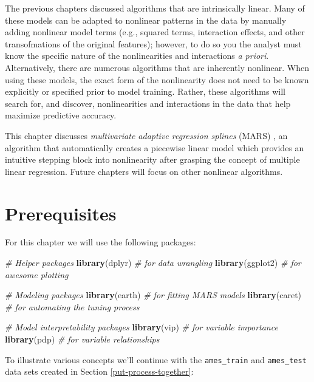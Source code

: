 \documentclass[]{krantz}
\makeatletter
\newenvironment{Shaded}{\begin{snugshade}}{\end{snugshade}}
\newcommand{\CommentTok}[1]{\textcolor[rgb]{0.37,0.37,0.37}{\textit{#1}}}
\newcommand{\KeywordTok}[1]{\textcolor[rgb]{0.27,0.27,0.27}{\textbf{#1}}}
\newcommand{\NormalTok}[1]{#1}
\newenvironment{kframe}{%
\medskip{}
\setlength{\fboxsep}{.8em}
 \def\at@end@of@kframe{}%
 \ifinner\ifhmode%
  \def\at@end@of@kframe{\end{minipage}}%
  \begin{minipage}{\columnwidth}%
 \fi\fi%
 \def\FrameCommand##1{\hskip\@totalleftmargin \hskip-\fboxsep
 \colorbox{shadecolor}{##1}\hskip-\fboxsep
     \hskip-\linewidth \hskip-\@totalleftmargin \hskip\columnwidth}%
 \MakeFramed {\advance\hsize-\width
   \@totalleftmargin\z@ \linewidth\hsize
   \@setminipage}}%
 {\par\unskip\endMakeFramed%
 \at@end@of@kframe}
\renewenvironment{Shaded}{\begin{kframe}}{\end{kframe}}
\makeatother
\begin{document}
The previous chapters discussed algorithms that are intrinsically linear. Many of these models can be adapted to nonlinear patterns in the data by manually adding nonlinear model terms (e.g., squared terms, interaction effects, and other transofmations of the original features); however, to do so you the analyst must know the specific nature of the nonlinearities and interactions \emph{a priori}. Alternatively, there are numerous algorithms that are inherently nonlinear. When using these models, the exact form of the nonlinearity does not need to be known explicitly or specified prior to model training. Rather, these algorithms will search for, and discover, nonlinearities and interactions in the data that help maximize predictive accuracy.

This chapter discusses \emph{multivariate adaptive regression splines} (MARS) \citep{friedman1991multivariate}, an algorithm that automatically creates a piecewise linear model which provides an intuitive stepping block into nonlinearity after grasping the concept of multiple linear regression. Future chapters will focus on other nonlinear algorithms.

\hypertarget{prerequisites-5}{%
\section{Prerequisites}\label{prerequisites-5}}

For this chapter we will use the following packages:

\begin{Shaded}
\begin{Highlighting}[]
\CommentTok{# Helper packages}
\KeywordTok{library}\NormalTok{(dplyr)     }\CommentTok{# for data wrangling}
\KeywordTok{library}\NormalTok{(ggplot2)   }\CommentTok{# for awesome plotting}

\CommentTok{# Modeling packages}
\KeywordTok{library}\NormalTok{(earth)     }\CommentTok{# for fitting MARS models}
\KeywordTok{library}\NormalTok{(caret)     }\CommentTok{# for automating the tuning process}

\CommentTok{# Model interpretability packages}
\KeywordTok{library}\NormalTok{(vip)       }\CommentTok{# for variable importance}
\KeywordTok{library}\NormalTok{(pdp)       }\CommentTok{# for variable relationships}
\end{Highlighting}
\end{Shaded}

To illustrate various concepts we'll continue with the \texttt{ames\_train} and \texttt{ames\_test} data sets created in Section \ref{put-process-together}:
\end{document}

